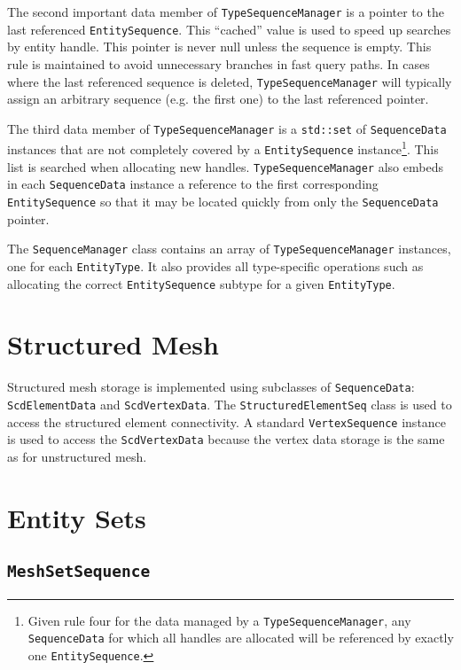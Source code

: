 \documentclass{report}
\begin{document}
The second important data member of \texttt{TypeSequenceManager} is a pointer to the last referenced \texttt{EntitySequence}.  This ``cached'' value is used to speed up searches by entity handle.  This pointer is never null unless the sequence is empty.  This rule is maintained to avoid unnecessary branches in fast query paths.  In cases where the last referenced sequence is deleted, \texttt{TypeSequenceManager} will typically assign an arbitrary sequence (e.g. the first one) to the last referenced pointer.

The third data member of \texttt{TypeSequenceManager} is a \texttt{std::set} of \texttt{SequenceData} instances that are not completely covered by a \texttt{EntitySequence} instance\footnote{Given rule four for the data managed by a \texttt{TypeSequenceManager}, any \texttt{SequenceData} for which all handles are allocated will be referenced by exactly one \texttt{EntitySequence}.}.  This list is searched when allocating new handles.  \texttt{TypeSequenceManager} also embeds in each \texttt{SequenceData} instance a reference to the first corresponding \texttt{EntitySequence} so that it may be located quickly from only the \texttt{SequenceData} pointer.

The \texttt{SequenceManager} class contains an array of \texttt{TypeSequenceManager} instances, one for each \texttt{EntityType}.  It also provides all type-specific operations such as allocating the correct \texttt{EntitySequence} subtype for a given \texttt{EntityType}.  


\section{Structured Mesh}

Structured mesh storage is implemented using subclasses of \texttt{SequenceData}: \texttt{ScdElementData} and \texttt{ScdVertexData}. The \texttt{StructuredElementSeq} class is used to access the structured element connectivity.  A standard \texttt{VertexSequence} instance is used to access the \texttt{ScdVertexData} because the vertex data storage is the same as for unstructured mesh.

\section{Entity Sets}

\subsection{\texttt{MeshSetSequence}}
\end{document}
